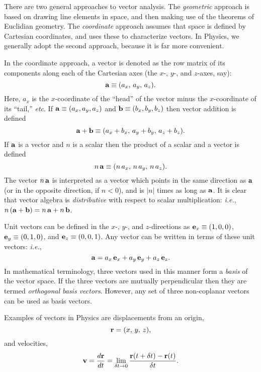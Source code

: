 There are two  general approaches to vector analysis. The {\em geometric}\/ approach is
based on drawing line elements in space,  and then making use
of the theorems of Euclidian geometry. The {\em coordinate}\/ approach assumes that
space is defined by Cartesian coordinates, and uses these to characterize vectors.
In Physics, we generally
adopt the second approach, because it is far more convenient.

In the coordinate approach, a vector is  denoted as the row matrix of
its components along each of the Cartesian axes (the $x$-, $y$-, and $z$-axes, say):
\begin{equation}
{\bf a} \equiv (a_x,\, a_y,\, a_z).
\end{equation}
Here, $a_x$ is the $x$-coordinate of the ``head'' of the vector minus
the $x$-coordinate of its ``tail,'' {\em etc}.
If ${\bf a} \equiv (a_x, a_y, a_z)$ and ${\bf b} \equiv (b_x, b_y, b_z)$
then vector addition is defined
\begin{equation}
{\bf a} + {\bf b} \equiv (a_x+b_x,\, a_y+b_y,\, a_z+b_z).
\end{equation}
If ${\bf a}$ is a vector and $n$ is a scalar then the product 
of a scalar and a vector is defined
\begin{equation}
n\,{\bf a} \equiv (n\,a_x,\, n\,a_y,\, n\,a_z).
\end{equation}
The vector $n\,{\bf a}$ is interpreted as a vector which points
in the same direction as ${\bf a}$ (or in the opposite
direction, if $n<0$), and is $|n|$ times as long as ${\bf a}$.
It is clear that vector algebra is {\em distributive} with respect to
scalar multiplication: {\em i.e.},  $n\,({\bf a} + {\bf b}) = n\,{\bf a} + n\,{\bf b}$. 

Unit vectors can be defined in the $x$-, $y$-, and $z$-directions as
${\bf e}_x \equiv (1,0,0)$, ${\bf e}_y \equiv (0,1,0)$, and ${\bf e}_z \equiv
(0,0,1)$. Any vector can be written in terms of these unit vectors: {\em i.e.},
\begin{equation}
{\bf a} = a_x\, {\bf e}_x + a_y \,{\bf e}_y + a_z\,{\bf e}_z.
\end{equation}
In mathematical terminology,
three vectors used in this manner form a {\em basis}\/ of the vector space. If the
three vectors are mutually perpendicular then they are termed {\em orthogonal basis
vectors}. However, any set of three non-coplanar vectors can be used as basis
vectors.

Examples of vectors in Physics are displacements from an origin,
\begin{equation}
{\bf r} = (x,\, y,\, z),
\end{equation}
and velocities,
\begin{equation}
{\bf v} = \frac{d {\bf r}}{dt} = \lim_{\delta t\rightarrow 0} 
\frac{ {\bf r}(t+\delta t) - {\bf r}(t) }{\delta t}.
\end{equation}

